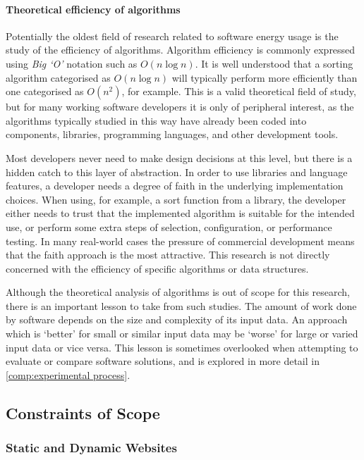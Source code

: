 \paragraph{Theoretical efficiency of algorithms}

Potentially the oldest field of research related to software energy usage is the study of the efficiency of algorithms. Algorithm efficiency is commonly expressed using \emph{Big `O'} notation such as $O(n\log{}n)$. It is well understood that a sorting algorithm categorised as $O(n\log n)$ will typically perform more efficiently than one categorised as $O(n^2)$, for example. This is a valid theoretical field of study, but for many working software developers it is only of peripheral interest, as the algorithms typically studied in this way have already been coded into components, libraries, programming languages, and other development tools. 

Most developers never need to make design decisions at this level, but there is a hidden catch to this layer of abstraction. In order to use libraries and language features, a developer needs a degree of faith in the underlying implementation choices. When using, for example, a sort function from a library, the developer either needs to trust that the implemented algorithm is suitable for the intended use, or perform some extra steps of selection, configuration, or performance testing. In many real-world cases the pressure of commercial development means that the faith approach is the most attractive. This research is not directly concerned with the efficiency of specific algorithms or data structures.

Although the theoretical analysis of algorithms is out of scope for this research, there is an important lesson to take from such studies. The amount of work done by software depends on the size and complexity of its input data. An approach which is `better' for small or similar input data may be `worse' for large or varied input data or vice versa. This lesson is sometimes overlooked when attempting to evaluate or compare software solutions, and is explored in more detail in \autoref{comp:experimental process}.

\subsection{Constraints of Scope}

\subsubsection{Static and Dynamic Websites}

